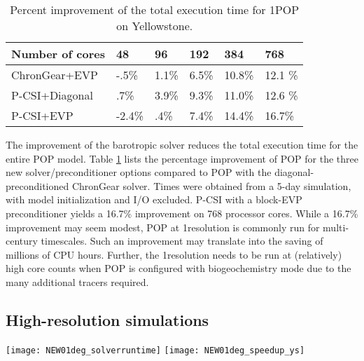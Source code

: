\begin{table}[!h]
\begin{center}
\caption{Percent improvement of the total execution time for
  1\degree\space POP on Yellowstone. \label{tab:improve_1}}
\begin{scriptsize}
\begin{tabular}{|l||l|l|l|l|l|}
\hline
Number of cores & 48  & 96  & 192 & 384 & 768\\\hline
\hline
ChronGear+EVP & -.5\% & 1.1\%  & 6.5\% & 10.8\%  & 12.1 \% \\\hline
P-CSI+Diagonal  & .7\% &3.9\% &9.3\%  &11.0\% & 12.6 \% \\\hline
P-CSI+EVP	      &-2.4\% & .4\%	& 7.4\%  & 14.4\% & 16.7\%\\\hline
\end{tabular}
\end{scriptsize}
\vspace{-.2in}
\end{center}
\end{table}


The improvement of the barotropic solver reduces the total execution time for the entire
POP model.  Table \ref{tab:improve_1} lists the percentage
improvement of POP for the three new solver/preconditioner options
compared to POP with the diagonal-preconditioned ChronGear solver. 
Times were obtained from a 5-day simulation, with model initialization
and I/O excluded. P-CSI with a block-EVP preconditioner yields a 16.7\% improvement on 768 processor cores.  
While a 16.7\% improvement may seem modest, POP at 1\degree\space resolution is commonly run for multi-century timescales.  Such an improvement may translate into the saving of millions of CPU hours.  Further,
the 1\degree\space resolution needs to be run at (relatively) high core counts
when POP is configured with biogeochemistry mode due to the many additional
tracers required.

\subsection{High-resolution simulations}
\begin {figure*}[t!]
\begin{center}
\texttt{[image: NEW01deg\_solverruntime]}
\hspace{10pt}
\texttt{[image: NEW01deg\_speedup\_ys]}
\end{center}
\vspace{-.2in}
\caption []{Execution times for the barotropic mode in 0.1\degree\space POP
  for one simulation day on Yellowstone (left). 
The core simulation rates of 0.1\degree\space POP on Yellowstone (right).\label {fig:runtime01}}
\end {figure*}


